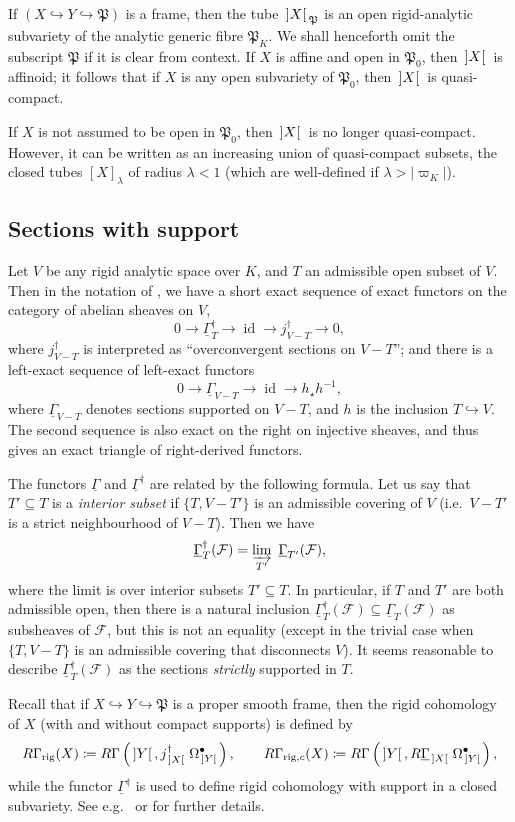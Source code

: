 \documentclass[cjm]{ipart}
\theoremstyle{plain}
\theoremstyle{remark}
\DeclareMathOperator{\id}{id}
\DeclarePairedDelimiter{\tb}{{\,]}}{{[\, }} %
\newcommand{\cF}{\mathcal{F}}
\newcommand{\fP}{\mathfrak{P}}
\newcommand{\into}{\hookrightarrow}
\newcommand{\rig}{\mathrm{rig}}
\newcommand{\uGa}{\underline{\Gamma}}
\numberwithin{equation}{subsection}
\begin{document}
  If $(X\into Y \into \fP)$ is a frame, then the tube $\tb{X}_{\fP}$ is an open rigid-analytic subvariety of the analytic generic fibre $\fP_K$. We shall henceforth omit the subscript $\fP$ if it is clear from context. If $X$ is affine and open in $\fP_0$, then $\tb{X}$ is affinoid; it follows that if $X$ is any open subvariety of $\fP_0$, then $\tb{X}$ is quasi-compact.

  If $X$ is not assumed to be open in $\fP_0$, then $\tb{X}$ is no longer quasi-compact. However, it can be written as an increasing union of quasi-compact subsets, the closed tubes $[X]_{\lambda}$ of radius $\lambda < 1$ (which are well-defined if $\lambda > |\varpi_K|$).

 \subsection{Sections with support}

  Let $V$ be any rigid analytic space over $K$, and $T$ an admissible open subset of $V$. Then in the notation of \cite[\S 5.1 and 5.2]{lestum07}, we have a short exact sequence of exact functors on the category of abelian sheaves on $V$,
  \[ 0 \to \uGa^\dag_T  \to \id \to j^\dag_{V-T} \to 0,\]
  where $j^\dag_{V-T}$ is interpreted as ``overconvergent sections on $V-T$''; and there is a left-exact sequence of left-exact functors
  \[ 0 \to \uGa_{V-T} \to \id \to h_\star h^{-1}, \]
  where $\uGa_{V-T}$ denotes sections supported on $V-T$, and $h$ is the inclusion $T \into V$. The second sequence is also exact on the right on injective sheaves, and thus gives an exact triangle of right-derived functors.

  The functors $\uGa$ and $\uGa^\dag$ are related by the following formula. Let us say that $T' \subseteq T$ is a \emph{interior subset} if $\{ T, V-T' \}$ is an admissible covering of $V$ (i.e.~$V-T'$ is a strict neighbourhood of $V-T$). Then we have
  \[ \uGa^\dag_T(\cF) = \varinjlim_{T'}\ \uGa_{T'}(\cF), \]
  where the limit is over interior subsets $T' \subseteq T$. In particular, if $T$ and $T'$ are both admissible open, then there is a natural inclusion $\uGa^\dag_T(\cF) \subseteq \uGa_T(\cF)$ as subsheaves of $\cF$, but this is not an equality (except in the trivial case  when $\{ T, V-T\}$ is an admissible covering that disconnects $V$). It seems reasonable to describe $\uGa^\dag_T(\cF)$ as the sections \emph{strictly} supported in $T$.

  \begin{remark}
   Recall that if $X \into Y \into \fP$ is a proper smooth frame, then the rigid cohomology of $X$ (with and without compact supports) is defined by
   \[ R\Gamma_{\rig}(X) \coloneqq R\Gamma\left(\tb{Y}, j^\dag_{\tb{X}}\, \Omega^{\bullet}_{\tb{Y}}\right), \qquad R\Gamma_{\rig, c}(X) \coloneqq R\Gamma\left(\tb{Y}, R\uGa_{\tb{X}}\, \Omega^{\bullet}_{\tb{Y}}\right),\]
   while the functor $\uGa^\dag$ is used to define rigid cohomology with support in a closed subvariety. See e.g.~\cite{berthelot97} or \cite[Chapter 5]{lestum07} for further details.
  \end{remark}
\end{document}
